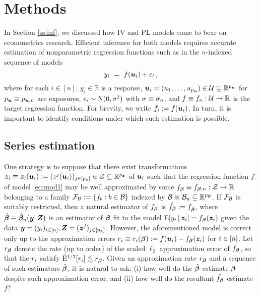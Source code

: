 \documentclass{uwstat572}
\newcommand{\be}{\begin{equation}}
\newcommand{\ee}{\end{equation}}
\theoremstyle{definition}
\theoremstyle{remark}
\newcommand{\R}{\ensuremath{\mathbb{R}}}
\newcommand{\E}{\mathrm{E}}
\newcommand{\En}{\bar{\E}}
\newcommand{\Normal}{\mathrm{N}}
\numberwithin{equation}{section}
\begin{document}
\section{Methods}

In Section \ref{ss:inf}, we discussed how IV and PL models come to bear on econometrics research. Efficient inference for both models requires accurate estimation of nonparametric regression functions such as in the $n$-indexed sequence of models
\be\label{eq:mod1}
	y_i \ = \ f(\u_i) + \ersi\,,
\ee
where for each $i\in[n]$, $y_i \in \R$ is a response, $\u_i = (u_1,\ldots,u_{\pu}) \in \Us \subseteq \R^{\pu}$ for $p_{\boldsymbol{u}} \equiv p_{\boldsymbol{u},n}$ are exposures, $\ersi \sim \Normal(0,\sd^2)$ with $\sigma \equiv \sigma_n$, and $f \equiv f_n : \Us \to \R$ is the target regression function. For brevity, we write $f_i := f(\boldsymbol{u}_i)$. In turn, it is important to identify conditions under which such estimation is possible. 




%
% 
\subsection{Series estimation}\label{ss:se}

One strategy is to suppose that there exist transformations $\z_i \equiv \z_i(\u_i) := (z^j(\u_i))_{j\in[\pz]} \in \Zs \subseteq \R^{\pz}$ of $\boldsymbol{u}_i$ such that the regression function $f$ of model \eqref{eq:mod1} may be well approximated by some $\fb \equiv \fbn : \Zs \to \R$ belonging to a family $\mathcal{F}_{\mathcal{B}} := \{ f_b:b\in\mathcal{B}\}$ indexed by $\Bs \equiv \Bs_n \subseteq \R^{p_\Bs}$. If $\mathcal{F}_{\mathcal{B}}$ is suitably restricted, then a natural estimator of $f_{\boldsymbol{\beta}}$ is $\hat{f_{\boldsymbol{\beta}}} := f_{\hat{\boldsymbol{\beta}}}$, where $\hat{\boldsymbol{\beta}} \equiv \hat{\boldsymbol{\beta}}_n(\boldsymbol{y}, \boldsymbol{Z})$ is an estimator of $\boldsymbol{\beta}$ fit to the model $\E[y_i\,|\,\z_i] = \fb(\z_i)$ given the data $\boldsymbol{y} = (y_i)_{i\in[n]}, \boldsymbol{Z} = (\boldsymbol{z}^j)_{j\in[{p_{\boldsymbol{z}}}]}$. However, the aforementioned model is correct only up to the approximation errors $r_i \equiv r_i(\boldsymbol{\beta}) := f(\boldsymbol{u}_i) - f_{\boldsymbol{\beta}}(\boldsymbol{z}_i)$ for $i\in[n]$. Let $r_{\boldsymbol{\beta}}$ denote the rate (up to order) of the scaled $\ell_2$ approximation error of $f_{\boldsymbol{\beta}}$, so that the $r_i$ satisfy $\En^{1/2}[r_i] \lesssim \rb$. Given an approximation rate $r_{\boldsymbol{\beta}}$ and a sequence of such estimators $\hat{\boldsymbol{\beta}}$, it is natural to ask: (i) how well do the $\hat{\boldsymbol{\beta}}$ estimate $\boldsymbol{\beta}$ despite such approximation error, and (ii) how well do the resultant $\hat{f_{\boldsymbol{\beta}}}$ estimate $f$? 


%
\end{document}
